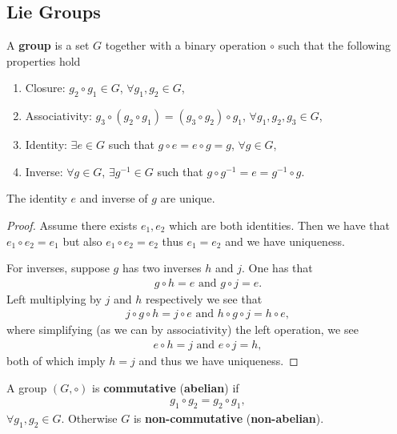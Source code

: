 \subsection{Lie Groups}

\begin{definition}
    A \textbf{group} is a set $G$ together with a binary operation $\circ$ such that the following properties hold
    \begin{enumerate}[label=\roman*)]
        \item Closure: $g_2 \circ g_1 \in G$, $\forall g_1, g_2 \in G$,
        \item Associativity: $g_3 \circ \left( g_2 \circ g_1 \right) = \left( g_3 \circ g_2 \right)  \circ g_1$, $\forall g_1, g_2, g_3 \in G$,
        \item Identity: $\exists e \in G$ such that $g \circ e = e \circ g = g$, $\forall g \in G$,
        \item Inverse: $\forall g \in G$, $\exists g^{-1} \in G$ such that $g \circ g^{-1} = e = g^{-1} \circ g$.
    \end{enumerate}
\end{definition}

The identity $e$ and inverse of $g$ are unique.

\begin{proof}
    Assume there exists $e_1, e_2$ which are both identities. Then we have that
    $e_1 \circ e_2 = e_1$ but also $e_1 \circ e_2 = e_2$ thus $e_1 = e_2$ and we have uniqueness. 

    For inverses, suppose $g$ has two inverses $h$ and $j$. One has that
    \begin{align}
        g \circ h = e \text{~and~} g \circ j = e
    .\end{align}
    Left multiplying by $j$ and $h$ respectively we see that
    \begin{align}
       j \circ g \circ h = j \circ e \text{~and~} h \circ g \circ j = h \circ e
    ,\end{align}
    where simplifying (as we can by associativity) the left operation, we see
    \begin{align}
        e \circ h = j \text{~and~} e \circ j = h
    ,\end{align}
    both of which imply $h = j$ and thus we have uniqueness.
\end{proof}

\begin{definition}
    A group $\left( G, \circ \right) $ is \textbf{commutative} (\textbf{abelian}) if
    \begin{align}
        g_1 \circ g_2 = g_2 \circ g_1
    ,\end{align}
    $\forall g_1, g_2 \in G$. Otherwise $G$ is \textbf{non-commutative} (\textbf{non-abelian}).
\end{definition}





